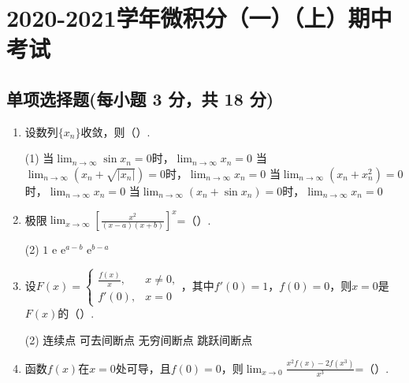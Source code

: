 \documentclass[../Main.tex]{subfiles}
\begin{document}
\chapter{2020-2021学年微积分（一）（上）期中考试}

\section{单项选择题(每小题 3 分，共 18 分)}
\begin{enumerate}
    \item 设数列$\{x_{n}\}$收敛，则（\qquad）.

          \begin{tasks}[label=\textbf{\Alph*.}, label-width=1.5em, column-sep=1em](1)
              \task 当$\lim_{n\to\infty}\sin x_{n}=0$时，$\lim_{n\to\infty}x_{n}=0$
              \task 当$\lim_{n\to\infty}\left(x_{n}+\sqrt{|x_{n}|}\right)=0$时，$\lim_{n\to\infty}x_{n}=0$
              \task 当$\lim_{n\to\infty}\left(x_{n}+x_{n}^{2}\right)=0$时，$\lim_{n\to\infty}x_{n}=0$
              \task 当$\lim_{n\to\infty}\left(x_{n}+\sin x_{n}\right)=0$时，$\lim_{n\to\infty}x_{n}=0$
          \end{tasks}

    \item 极限$\lim_{x\to\infty}\left[\frac{x^{2}}{(x-a)(x+b)}\right]^{x}$=（\qquad）.

          \begin{tasks}[label=\textbf{\Alph*.}, label-width=1.5em, column-sep=1em](2)
              \task $1$
              \task $\mathrm{e}$
              \task $\mathrm{e}^{a-b}$
              \task $\mathrm{e}^{b-a}$
          \end{tasks}

    \item 设$F(x)=
              \begin{cases}
                  \frac{f(x)}{x}, & x\neq0, \\
                  f'(0),          & x=0
              \end{cases}$，其中$f'(0)=1$，$f(0)=0$，则$x=0$是$F(x)$的（\qquad）.

          \begin{tasks}[label=\textbf{\Alph*.}, label-width=1.5em, column-sep=1em](2)
              \task 连续点
              \task 可去间断点
              \task 无穷间断点
              \task 跳跃间断点
          \end{tasks}

    \item 函数$f(x)$在$x=0$处可导，且$f(0)=0$，则$\lim_{x\to0}\frac{x^{2}f(x)-2f(x^{3})}{x^{3}}$=（\qquad）.


\end{enumerate}
\end{document}
